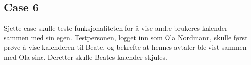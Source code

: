 \subsection{Case 6}
	Sjette case skulle teste funksjonaliteten for å vise andre brukeres kalender sammen med sin egen. Testpersonen, logget inn som Ola Nordmann, skulle først prøve å vise kalenderen til Beate, og bekrefte at hennes avtaler ble vist sammen med Ola sine. Deretter skulle Beates kalender skjules.